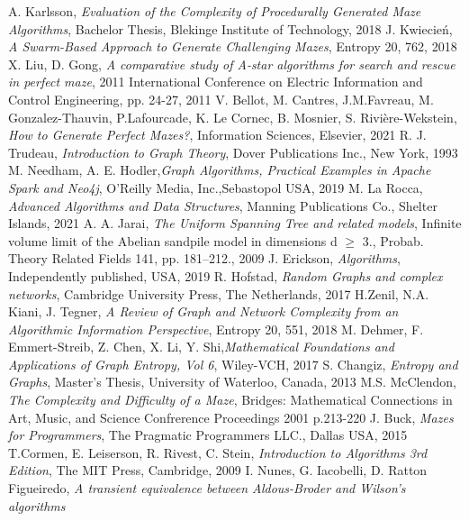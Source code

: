 
\begin{thebibliography}{100}
A. Karlsson, \emph{Evaluation of the Complexity of Procedurally Generated Maze Algorithms}, Bachelor Thesis,
Blekinge Institute of Technology, 2018
J. Kwiecień, \emph{A Swarm-Based Approach to Generate Challenging Mazes}, Entropy 20, 762, 2018
X. Liu, D. Gong, \emph{A comparative study of A-star algorithms for search and rescue in perfect maze}, 2011 International Conference
on Electric Information and Control Engineering, pp. 24-27, 2011
V. Bellot, M. Cantres, J.M.Favreau, M. Gonzalez-Thauvin, P.Lafourcade, K. Le Cornec, B. Mosnier, S. Rivière-Wekstein,
\emph{How to Generate Perfect Mazes?}, Information Sciences, Elsevier, 2021
R. J. Trudeau, \emph{Introduction to Graph Theory}, Dover Publications Inc., New York, 1993
M. Needham, A. E. Hodler,\emph{Graph Algorithms, Practical Examples in Apache Spark and Neo4j}, O’Reilly Media, Inc.,Sebastopol USA, 2019
M. La Rocca, \emph{Advanced Algorithms and Data Structures}, Manning Publications Co., Shelter Islands, 2021
A. A. Jarai, \emph{The Uniform Spanning Tree and related models},  Infinite volume limit of the Abelian sandpile model in
dimensions d $≥$ 3., Probab. Theory Related Fields 141, pp. 181–212., 2009
J. Erickson, \emph{Algorithms}, Independently published, USA, 2019
R. Hofstad, \emph{Random Graphs and complex networks}, Cambridge University Press, The Netherlands, 2017
H.Zenil, N.A. Kiani, J. Tegner, \emph{A Review of Graph and Network Complexity from an Algorithmic Information Perspective},
Entropy 20, 551, 2018
M. Dehmer, F. Emmert-Streib, Z. Chen, X. Li, Y. Shi,\emph{Mathematical Foundations and Applications of Graph Entropy, Vol 6},
Wiley-VCH, 2017
S. Changiz, \emph{Entropy and Graphs}, Master's Thesis, University of Waterloo, Canada, 2013
M.S. McClendon, \emph{The Complexity and Difficulty of a Maze}, Bridges: Mathematical Connections in Art, Music,
and Science Confrerence Proceedings 2001 p.213-220
J. Buck, \emph{Mazes for Programmers}, The Pragmatic Programmers LLC., Dallas USA, 2015
T.Cormen, E. Leiserson, R. Rivest, C. Stein, \emph{Introduction to Algorithms 3rd Edition}, The MIT Press, Cambridge, 2009
I. Nunes, G. Iacobelli, D. Ratton Figueiredo, \emph{A transient equivalence between Aldous-Broder and Wilson's algorithms
}
\end{thebibliography}
